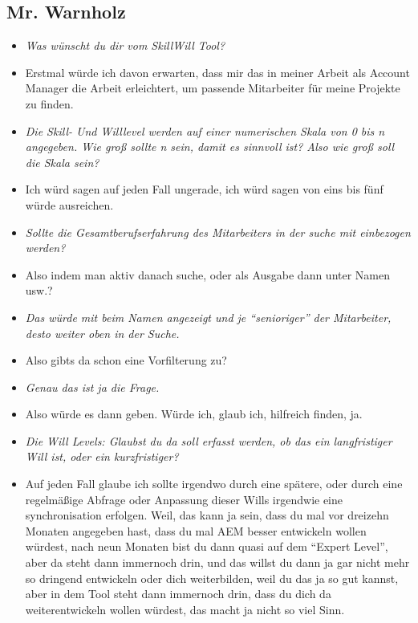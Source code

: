 \begin{appendices}
\newpage

\subsection{Mr. Warnholz}
\begin{itemize}
\item[] \textit{Was wünscht du dir vom SkillWill Tool?}
\item[] Erstmal würde ich davon erwarten, dass mir das in meiner Arbeit als Account Manager die Arbeit erleichtert, um passende Mitarbeiter für meine Projekte zu finden.

\item[] \textit{Die Skill- Und Willlevel werden auf einer numerischen Skala von 0 bis n angegeben. Wie groß sollte n sein, damit es sinnvoll ist? Also wie groß soll die Skala sein?}
\item[] Ich würd sagen auf jeden Fall ungerade, ich würd sagen von eins bis fünf würde ausreichen.

\item[] \textit{Sollte die Gesamtberufserfahrung des Mitarbeiters in der suche mit einbezogen werden?}
\item[] Also indem man aktiv danach suche, oder als Ausgabe dann unter Namen usw.?

\item[] \textit{Das würde mit beim Namen angezeigt und je “senioriger” der Mitarbeiter, desto weiter oben in der Suche.}
\item[] Also gibts da schon eine Vorfilterung zu?

\item[] \textit{Genau das ist ja die Frage.}
\item[] Also würde es dann geben. Würde ich, glaub ich, hilfreich finden, ja.

\item[] \textit{Die Will Levels: Glaubst du da soll erfasst werden, ob das ein langfristiger Will ist, oder ein kurzfristiger?}
\item[] Auf jeden Fall glaube ich sollte irgendwo durch eine spätere, oder durch eine regelmäßige Abfrage oder Anpassung dieser Wills irgendwie eine synchronisation erfolgen. Weil, das kann ja sein, dass du mal vor dreizehn Monaten angegeben hast, dass du mal AEM besser entwickeln wollen würdest, nach neun Monaten bist du dann quasi auf dem “Expert Level”, aber da steht dann immernoch drin, und das willst du dann ja gar nicht mehr so dringend entwickeln oder dich weiterbilden, weil du das ja so gut kannst, aber in dem Tool steht dann immernoch drin, dass du dich da weiterentwickeln wollen würdest, das macht ja nicht so viel Sinn.


\end{itemize}
\end{appendices}
